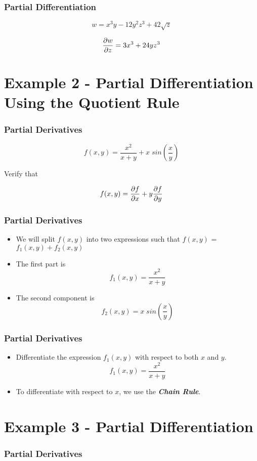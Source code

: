 \documentclass{beamer}
\begin{document}
\begin{frame}
\frametitle{Partial Differentiation}
\Large
\[ w = x^3y -12y^2z^3 + 42 \sqrt{z}\]

\[ {\partial w \over \partial z } =3x^3 + 24yz^3\]
\end{frame}

\section{Example 2 - Partial Differentiation Using the Quotient Rule}
\begin{frame}
\frametitle{Partial Derivatives}
\Large
\vspace{-2cm}

\[f(x,y)  = \frac{x^2}{x+y} + x\;sin\left(\frac{x}{y}\right) \]

Verify that 

\[ f(x,y) = { \partial f \over \partial x } + y { \partial f \over \partial y } \]

\end{frame}
\begin{frame}
\frametitle{Partial Derivatives}
\Large
\vspace{-1cm}

\begin{itemize}
\item We will split $f(x,y)$ into two expressions such that $f(x,y)$ = $f_1(x,y) + f_2(x,y)$
\item The first part is 
\[f_1(x,y)  = \frac{x^2}{x+y} \]
\item The second component is 
\[f_2(x,y)  = x\;sin\left(\frac{x}{y}\right) \]
\end{itemize}
\end{frame}
\begin{frame}
\frametitle{Partial Derivatives}
\Large
\vspace{-2cm}

\begin{itemize}
\item Differentiate the expression $f_1(x,y)$ with respect to both $x$ and $y$.
\[f_1(x,y)  = \frac{x^2}{x+y} \]
\item To differentiate with respect to $x$, we use the \textbf{\textit{Chain Rule}}.
\end{itemize}
\end{frame}
\section{Example 3 - Partial Differentiation}
\begin{frame}
\frametitle{Partial Derivatives}
\Large
\vspace{-2cm}

\end{frame}
\end{document}
